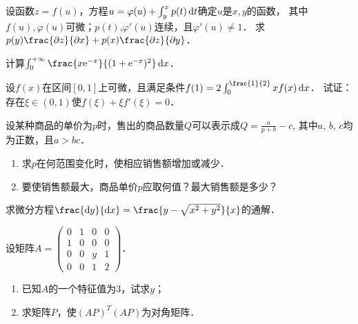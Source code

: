 \documentclass[plain,noanswer,medmath]{../../template/jnuexam}
\begin{document}

\begin{problem}
设函数$z = f(u)$，方程$u = \varphi(u) + \int_y^x p(t)\mathop{}\!\mathrm{d} t$确定$u$是$x,y$的函数，
其中$f(u),\varphi(u)$可微；$p(t)$,$\varphi'(u)$连续，且$\varphi'(u) \ne 1$．
求$p(y)\frac{\pdz}{\pdx} + p(x)\frac{\pdz}{\pdy}$．
\end{problem}



\begin{problem}
计算$\int_0^{+\infty} \frac{x\e^{- x}}{(1 + \e^{- x})^2} \dx$．
\end{problem}



\begin{problem}
设$f(x)$在区间$[0,1]$上可微，且满足条件$f(1) = 2\int_0^{\frac{1}{2}} xf(x)\dx$．
试证：存在$\xi \in(0,1)$使$f(\xi) + \xi f'(\xi) = 0$．
\end{problem}



\begin{problem}
设某种商品的单价为$p$时，售出的商品数量$Q$可以表示成$Q = \frac{a}{p + b} - c$,
其中$a$, $b$, $c$均为正数，且$a > bc$．
\begin{enumerate}
\item 求$p$在何范围变化时，使相应销售额增加或减少．
\item 要使销售额最大，商品单价$p$应取何值？最大销售额是多少？
\end{enumerate}
\end{problem}



\begin{problem}
求微分方程$\frac{\dy}{\dx} = \frac{y - \sqrt{x^2 + y^2}}{x}$的通解．
\end{problem}



\begin{problem}
设矩阵$A = \begin{pmatrix}
  0 & 1 & 0 & 0 \\
  1 & 0 & 0 & 0 \\
  0 & 0 & y & 1 \\
  0 & 0 & 1 & 2
\end{pmatrix}$．
\begin{enumerate}
\item 已知$A$的一个特征值为$3$，试求$y$；
\item 求矩阵$P$，使$(AP)^T(AP)$为对角矩阵．
\end{enumerate}
\end{problem}
\end{document}
